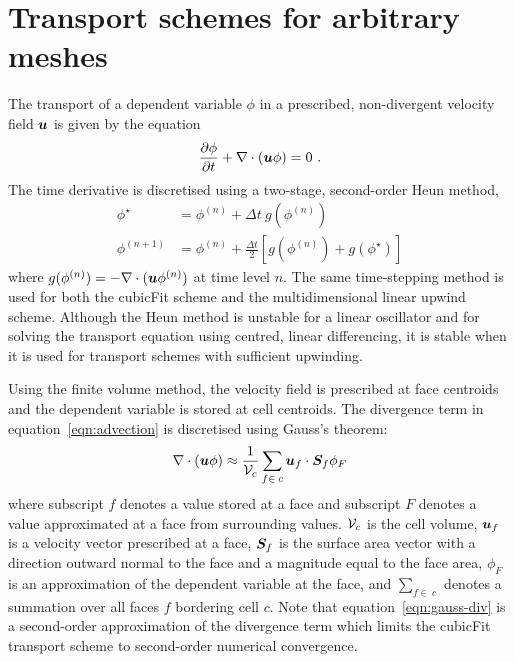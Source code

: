 \section{Transport schemes for arbitrary meshes}
\label{sec:cubicFit:transport}

The transport of a dependent variable $\phi$ in a prescribed, non-divergent velocity field $\bm{u}$ is given by the equation		
\begin{align}		
	\frac{\partial \phi}{\partial t} + \nabla \cdot \left( \bm{u} \phi \right) = 0 \text{ .} \label{eqn:advection}		
\end{align}
The time derivative is discretised using a two-stage, second-order Heun method,
\begin{subequations}
\begin{align}
	\phi^\star &= \phi^{(n)} + \Delta t \: g(\phi^{(n)}) \\
	\phi^{(n+1)} &= \phi^{(n)} + \frac{\Delta t}{2} \left[ g(\phi^{(n)}) + g(\phi^{\star}) \right]
\end{align} \label{eqn:heun}
\end{subequations}
\unskip where \(g(\phi^{(n)}) = - \nabla \cdot (\bm{u} \phi^{(n)})\) at time level \(n\).  The same time-stepping method is used for both the cubicFit scheme and the multidimensional linear upwind scheme.
Although the Heun method is unstable for a linear oscillator \citep{durran2013} and for solving the transport equation using centred, linear differencing, it is stable when it is used for transport schemes with sufficient upwinding. 

Using the finite volume method, the velocity field is prescribed at face centroids and the dependent variable is stored at cell centroids.  The divergence term in equation~\eqref{eqn:advection} is discretised using Gauss's theorem:
\begin{align}
	\nabla \cdot \left( \bm{u} \phi \right) \approx \frac{1}{\mathcal{V}_c} \sum_{f \in\:c} \bm{u}_f \cdot \bm{S}_f \phi_F \label{eqn:gauss-div}
\end{align}
where subscript $f$ denotes a value stored at a face and subscript $F$ denotes a value approximated at a face from surrounding values.  $\mathcal{V}_c$ is the cell volume, $\bm{u}_f$ is a velocity vector prescribed at a face, $\bm{S}_f$ is the surface area vector with a direction outward normal to the face and a magnitude equal to the face area, $\phi_F$ is an approximation of the dependent variable at the face, and $\sum_{f \in\:c}$ denotes a summation over all faces $f$ bordering cell $c$.
Note that equation~\eqref{eqn:gauss-div} is a second-order approximation of the divergence term which limits the cubicFit transport scheme to second-order numerical convergence. 

